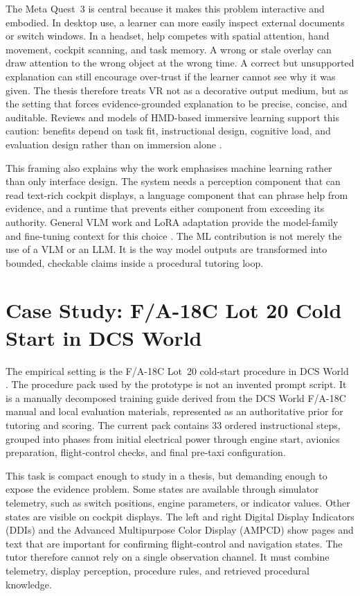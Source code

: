 The Meta Quest~3 is central because it makes this problem interactive and
embodied. In desktop use, a learner can more easily inspect external documents
or switch windows. In a headset, help competes with spatial attention, hand
movement, cockpit scanning, and task memory. A wrong or stale overlay can draw
attention to the wrong object at the wrong time. A correct but unsupported
explanation can still encourage over-trust if the learner cannot see why it was
given. The thesis therefore treats VR not as a decorative output medium, but as
the setting that forces evidence-grounded explanation to be precise, concise,
and auditable. Reviews and models of HMD-based immersive learning support this
caution: benefits depend on task fit, instructional design, cognitive load, and
evaluation design rather than on immersion alone
\citep{jensen2018vrhmd,radianti2020ivr,makransky2021camil}.

This framing also explains why the work emphasises machine learning rather than
only interface design. The system needs a perception component that can read
text-rich cockpit displays, a language component that can phrase help from
evidence, and a runtime that prevents either component from exceeding its
authority. General VLM work and LoRA adaptation provide the model-family and
fine-tuning context for this choice \citep{bai2023qwen,liu2023llava,hu2021lora}.
The ML contribution is not merely the use of a VLM or an LLM. It is the way
model outputs are transformed into bounded, checkable claims inside a
procedural tutoring loop.

\section{Case Study: F/A-18C Lot 20 Cold Start in DCS World}\label{sec:intro-case}

The empirical setting is the F/A-18C Lot~20 cold-start procedure in DCS World
\citep{dcsworld,eagledynamics2023hornetguide}. The procedure pack used by
the prototype is not an invented prompt script. It is a manually decomposed training
guide derived from the DCS World F/A-18C manual and local evaluation materials,
represented as an authoritative prior for tutoring and scoring. The current
pack contains 33 ordered instructional steps, grouped into phases from initial
electrical power through engine start, avionics preparation, flight-control
checks, and final pre-taxi configuration.

This task is compact enough to study in a thesis, but demanding enough to
expose the evidence problem. Some states are available through simulator
telemetry, such as switch positions, engine parameters, or indicator values.
Other states are visible on cockpit displays. The left and right Digital
Display Indicators (DDIs) and the Advanced Multipurpose Color Display (AMPCD)
show pages and text that are important for confirming flight-control and
navigation states. The tutor therefore cannot rely on a single observation
channel. It must combine telemetry, display perception, procedure rules, and
retrieved procedural knowledge.

